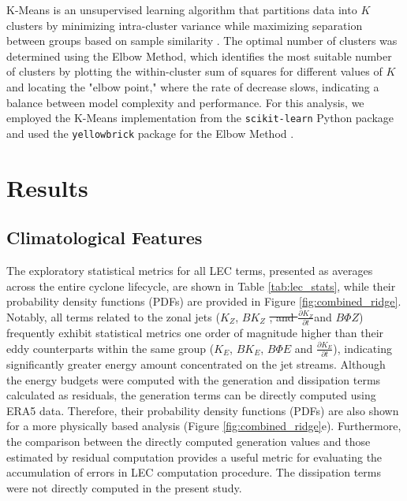 \documentclass[pdflatex,sn-chicago]{sn-jnl}%
\makeatletter
\theoremstyle{plain}
\theoremstyle{definition}
\theoremstyle{remark}
\theoremstyle{definition}
\providecommand{\DIFaddtex}[1]{{\protect\color{blue}#1}} %
\providecommand{\DIFdeltex}[1]{{\protect\color{red}\sout{#1}}} %
\providecommand{\DIFaddbegin}{} %
\providecommand{\DIFaddend}{} %
\providecommand{\DIFdelbegin}{} %
\providecommand{\DIFdelend}{} %
\providecommand{\DIFadd}[1]{\texorpdfstring{\DIFaddtex{#1}}{#1}} %
\providecommand{\DIFdel}[1]{\texorpdfstring{\DIFdeltex{#1}}{}} %
\let\sout@orig\sout %
\renewcommand{\sout}[1]{\ifmmode\text{\sout@orig{\ensuremath{#1}}}\else\sout@orig{#1}\fi} %
\makeatother
\begin{document}
K-Means is an unsupervised learning algorithm that partitions data into \( K \) clusters by minimizing intra-cluster variance while maximizing separation between groups based on sample similarity \citep{macqueen1967,hartiganwong1979}. The optimal number of clusters was determined using the Elbow Method, which identifies the most suitable number of clusters by plotting the within-cluster sum of squares for different values of \( K \) and locating the "elbow point," where the rate of decrease slows, indicating a balance between model complexity and performance. For this analysis, we employed the K-Means implementation from the \texttt{scikit-learn} Python package \citep{hao2019machine} and used the \texttt{yellowbrick} package for the Elbow Method \citep{bengfort2019yellowbrick}.



\section{Results}\label{sec:results}

\subsection{Climatological Features}\label{sec:climatology}

The exploratory statistical metrics for all LEC terms, presented as averages across the entire cyclone lifecycle, are shown in Table \ref{tab:lec_stats}, while their probability density functions (PDFs) are provided in Figure \ref{fig:combined_ridge}. Notably, all terms related to the zonal jets ($K_Z$, $BK_Z$ \DIFdelbegin \DIFdel{, and \(\frac{\partial K_Z}{\partial t}\)}\DIFdelend \DIFaddbegin \DIFadd{and $B\Phi Z$}\DIFaddend ) frequently exhibit statistical metrics one order of magnitude higher than their eddy counterparts within the same group ($K_E$, $BK_E$, \DIFaddbegin \DIFadd{$B\Phi E$ }\DIFaddend and \(\frac{\partial K_E}{\partial t}\)), indicating significantly greater energy amount concentrated on the jet streams. Although the energy budgets were computed with the generation and dissipation terms calculated as residuals, the generation terms can be directly computed using ERA5 data. Therefore, their probability density functions (PDFs) are also shown for a more physically based analysis (Figure \ref{fig:combined_ridge}e). Furthermore, the comparison between the directly computed generation values and those estimated by residual computation provides a useful metric for evaluating the accumulation of errors in LEC computation procedure. The dissipation terms were not directly computed in the present study.
\end{document}
